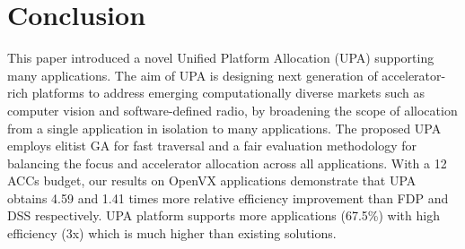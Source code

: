 \vspace{-2pt}
\section{Conclusion}
\label{sec:conclusion}

This paper introduced a novel Unified Platform Allocation (UPA) supporting many applications. The aim of UPA is designing next generation of accelerator-rich platforms to address emerging computationally diverse markets such as computer vision and software-defined radio, by broadening the scope of allocation from a single application in isolation to many applications. The proposed UPA employs elitist GA for fast traversal and a fair evaluation methodology for balancing the focus and accelerator allocation across all applications. With a 12 ACCs budget, our results on OpenVX applications demonstrate that UPA obtains 4.59 and 1.41 times more relative efficiency improvement than FDP and DSS respectively. UPA platform supports more applications (67.5\%) with high efficiency (3x) which is much higher than existing solutions.


